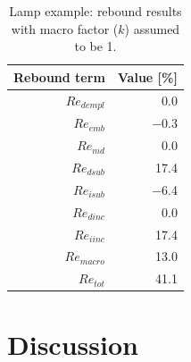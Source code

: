 \documentclass[12pt]{article}\usepackage[]{graphicx}\usepackage[]{xcolor}
\begin{document}
\begin{table}[ht]
\centering
\caption{Lamp example: rebound results with macro factor ($k$) assumed to be 1.} 
\label{tab:lamp_results}
\begin{tabular}{rr}
  \toprule
Rebound term & Value [\%] \\ 
  \midrule
$Re_{dempl}$ & 0.0 \\ 
  $Re_{emb}$ & $-$0.3 \\ 
  $Re_{md}$ & 0.0 \\ 
  $Re_{dsub}$ & 17.4 \\ 
  $Re_{isub}$ & $-$6.4 \\ 
  $Re_{dinc}$ & 0.0 \\ 
  $Re_{iinc}$ & 17.4 \\ 
  $Re_{macro}$ & 13.0 \\ 
   \midrule
$Re_{tot}$ & 41.1 \\ 
   \bottomrule
\end{tabular}
\end{table}



\section{Discussion}
\label{sec:discussion}
\end{document}

